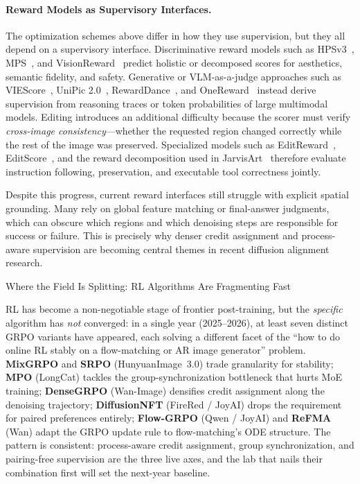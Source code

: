 \documentclass{llmxive}
\begin{document}
\paragraph{Reward Models as Supervisory Interfaces.}
The optimization schemes above differ in how they use supervision, but they all depend on a supervisory interface. Discriminative reward models such as HPSv3~\citep{ma2025hpsv3}, MPS~\citep{zhang2024learning}, and VisionReward~\citep{xu2024visionreward} predict holistic or decomposed scores for aesthetics, semantic fidelity, and safety. Generative or VLM-as-a-judge approaches such as VIEScore~\citep{ku2024viescore}, UniPic 2.0~\citep{wei2025skywork}, RewardDance~\citep{wu2025rewarddance}, and OneReward~\citep{gong2025onereward} instead derive supervision from reasoning traces or token probabilities of large multimodal models. Editing introduces an additional difficulty because the scorer must verify \emph{cross-image consistency}---whether the requested region changed correctly while the rest of the image was preserved. Specialized models such as EditReward~\citep{wu2025editreward}, EditScore~\citep{luo2025editscore}, and the reward decomposition used in JarvisArt~\citep{lin2025jarvisart} therefore evaluate instruction following, preservation, and executable tool correctness jointly.

Despite this progress, current reward interfaces still struggle with explicit spatial grounding. Many rely on global feature matching or final-answer judgments, which can obscure which regions and which denoising steps are responsible for success or failure. This is precisely why denser credit assignment and process-aware supervision are becoming central themes in recent diffusion alignment research.

\begin{highlightbox}{Where the Field Is Splitting: RL Algorithms Are Fragmenting Fast}

RL has become a non-negotiable stage of frontier post-training, but the \emph{specific} algorithm has \emph{not} converged: in a single year (2025--2026), at least seven distinct GRPO variants have appeared, each solving a different facet of the ``how to do online RL stably on a flow-matching or AR image generator'' problem. \textbf{MixGRPO} and \textbf{SRPO} (HunyuanImage~3.0) trade granularity for stability; \textbf{MPO} (LongCat) tackles the group-synchronization bottleneck that hurts MoE training; \textbf{DenseGRPO} (Wan-Image) densifies credit assignment along the denoising trajectory; \textbf{DiffusionNFT} (FireRed / JoyAI) drops the requirement for paired preferences entirely; \textbf{Flow-GRPO} (Qwen / JoyAI) and \textbf{ReFMA} (Wan) adapt the GRPO update rule to flow-matching's ODE structure. The pattern is consistent: process-aware credit assignment, group synchronization, and pairing-free supervision are the three live axes, and the lab that nails their combination first will set the next-year baseline.
\end{highlightbox}
\end{document}
